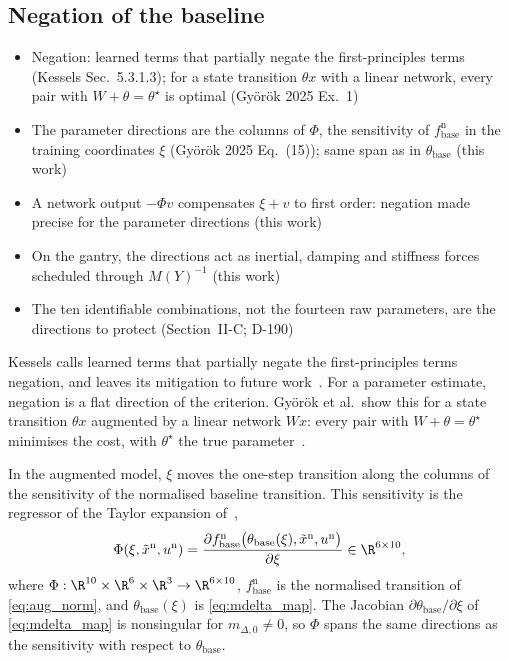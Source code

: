 \subsection{Negation of the baseline}\label{sec:obc_negation}
\ifdraft
\begin{itemize}
\item Negation: learned terms that partially negate the first-principles terms (Kessels Sec.~5.3.1.3); for a state transition $\theta x$ with a linear network, every pair with $W+\theta=\theta^\star$ is optimal (Gy\"or\"ok 2025 Ex.~1)
\item The parameter directions are the columns of $\Phi$, the sensitivity of $f^{\mathrm n}_{\mathrm{base}}$ in the training coordinates $\xi$ (Gy\"or\"ok 2025 Eq.~(15)); same span as in $\theta_{\mathrm{base}}$ (this work)
\item A network output $-\Phi v$ compensates $\xi+v$ to first order: negation made precise for the parameter directions (this work)
\item On the gantry, the directions act as inertial, damping and stiffness forces scheduled through $M(Y)^{-1}$ (this work)
\item The ten identifiable combinations, not the fourteen raw parameters, are the directions to protect (Section~II-C; D-190)
\end{itemize}
\fi

Kessels calls learned terms that partially negate the first-principles terms
negation, and leaves its mitigation to future
work~\cite[Sec.~5.3.1.3]{kessels2025ai}.
For a parameter estimate, negation is a flat direction of the criterion.
Gy\"or\"ok et al.\ show this for a state transition $\theta x$ augmented by a
linear network $Wx$: every pair with $W+\theta=\theta^\star$ minimises the
cost, with $\theta^\star$ the true parameter~\cite[Ex.~1]{gyorok2025l4dc}.

In the augmented model, $\xi$ moves the one-step transition along the columns
of the sensitivity of the normalised baseline transition.
This sensitivity is the regressor of the Taylor expansion
of~\cite[Eq.~(15)]{gyorok2025l4dc},
\begin{equation}
 \Phi(\xi,\tilde x^{\mathrm n},u^{\mathrm n})
 =\frac{\partial f^{\mathrm n}_{\mathrm{base}}\bigl(\theta_{\mathrm{base}}(\xi),
   \tilde x^{\mathrm n},u^{\mathrm n}\bigr)}{\partial\xi}\in\R^{6\times10},
 \label{eq:obc_sens}
\end{equation}
where $\Phi:\R^{10}\times\R^6\times\R^3\to\R^{6\times10}$,
$f^{\mathrm n}_{\mathrm{base}}$ is the normalised transition of
\eqref{eq:aug_norm}, and $\theta_{\mathrm{base}}(\xi)$ is
\eqref{eq:mdelta_map}.
The Jacobian $\partial\theta_{\mathrm{base}}/\partial\xi$ of
\eqref{eq:mdelta_map} is nonsingular for $m_{\Delta,0}\neq0$, so $\Phi$ spans
the same directions as the sensitivity with respect to
$\theta_{\mathrm{base}}$.

